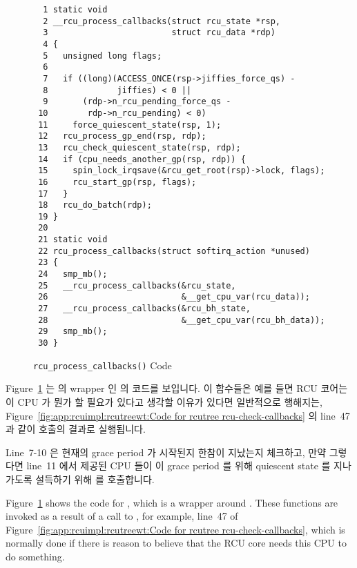 \begin{figure}[tbp]
{ \scriptsize
\begin{verbatim}
  1 static void
  2 __rcu_process_callbacks(struct rcu_state *rsp,
  3                         struct rcu_data *rdp)
  4 {
  5   unsigned long flags;
  6
  7   if ((long)(ACCESS_ONCE(rsp->jiffies_force_qs) -
  8              jiffies) < 0 ||
  9       (rdp->n_rcu_pending_force_qs -
 10        rdp->n_rcu_pending) < 0)
 11     force_quiescent_state(rsp, 1);
 12   rcu_process_gp_end(rsp, rdp);
 13   rcu_check_quiescent_state(rsp, rdp);
 14   if (cpu_needs_another_gp(rsp, rdp)) {
 15     spin_lock_irqsave(&rcu_get_root(rsp)->lock, flags);
 16     rcu_start_gp(rsp, flags);
 17   }
 18   rcu_do_batch(rdp);
 19 }
 20
 21 static void
 22 rcu_process_callbacks(struct softirq_action *unused)
 23 {
 24   smp_mb();
 25   __rcu_process_callbacks(&rcu_state,
 26                           &__get_cpu_var(rcu_data));
 27   __rcu_process_callbacks(&rcu_bh_state,
 28                           &__get_cpu_var(rcu_bh_data));
 29   smp_mb();
 30 }
\end{verbatim}
}
\caption{{\tt rcu\_process\_callbacks()} Code}
\label{fig:app:rcuimpl:rcutreewt:Code for rcutree rcu-process-callbacks}
\end{figure}

Figure~\ref{fig:app:rcuimpl:rcutreewt:Code for rcutree rcu-process-callbacks}
는  의 wrapper 인  의
코드를 보입니다.
이 함수들은 예를 들면 RCU 코어는 이 CPU 가 뭔가 할 필요가 있다고 생각할 이유가
있다면 일반적으로 행해지는,
Figure~\ref{fig:app:rcuimpl:rcutreewt:Code for rcutree rcu-check-callbacks} 의
line~47 과 같이  호출의 결과로 실행됩니다.

Line~7-10 은 현재의 grace period 가 시작된지 한참이 지났는지 체크하고, 만약
그렇다면 line~11 에서 제공된 CPU 들이 이 grace period 를 위해 quiescent state
를 지나가도록 설득하기 위해  를 호출합니다.
\iffalse

Figure~\ref{fig:app:rcuimpl:rcutreewt:Code for rcutree rcu-process-callbacks}
shows the code for , which is a wrapper around
.
These functions are invoked as a result of a call to
, for example, line~47 of
Figure~\ref{fig:app:rcuimpl:rcutreewt:Code for rcutree rcu-check-callbacks},
which is normally done if there is reason to believe that the RCU core
needs this CPU to do something.

